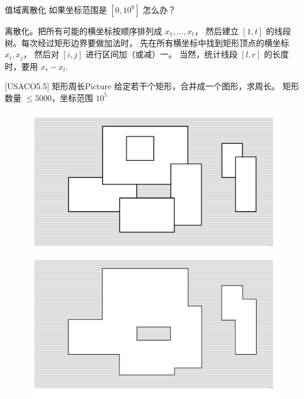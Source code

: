\documentclass{beamer}
\begin{document}
\begin{frame}{值域离散化}
    \small
    如果坐标范围是 $[0,10^9]$ 怎么办？

    \vspace{1em}\pause
    离散化。把所有可能的横坐标按顺序排列成 $x_1,...,x_t$，
    然后建立 $[1,t]$ 的线段树。每次经过矩形边界要做加法时，
    先在所有横坐标中找到矩形顶点的横坐标 $x_i,x_j$，
    然后对 $[i,j]$ 进行区间加（或减）一。
    当然，统计线段 $[l,r]$ 的长度时，要用 $x_r-x_l$.
\end{frame}

\begin{frame}{[USACO5.5] 矩形周长Picture}
    \small
    给定若干个矩形，合并成一个图形，求周长。
    矩形数量 $\leq 5000$，坐标范围 $10^5$
    \begin{figure}[H]
        \begin{minipage}[t]{0.49\textwidth}
            \centering
            \includegraphics[width=\textwidth]{pic/picture-1.png}
        \end{minipage}
        \begin{minipage}[t]{0.49\textwidth}
            \centering
            \includegraphics[width=\textwidth]{pic/picture-2.png}
        \end{minipage}
    \end{figure}
\end{frame}
\end{document}
